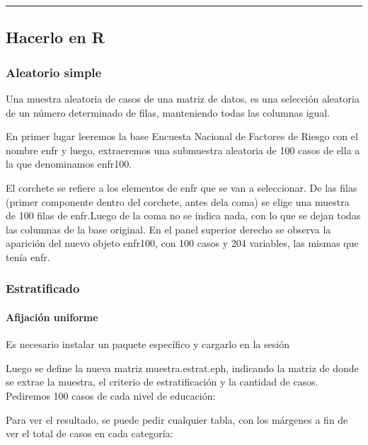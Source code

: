 \documentclass[]{article}
\let\oldparagraph\paragraph
\renewcommand{\paragraph}[1]{\oldparagraph{#1}\mbox{}}
\begin{document}
\begin{center}\rule{0.5\linewidth}{\linethickness}\end{center}

\hypertarget{hacerlo-en-r}{%
\subsection{Hacerlo en R}\label{hacerlo-en-r}}

\hypertarget{aleatorio-simple}{%
\subsubsection{Aleatorio simple}\label{aleatorio-simple}}

Una muestra aleatoria de casos de una matriz de datos, es una selección aleatoria de un número determinado de filas, manteniendo todas las columnas igual.

En primer lugar leeremos la base Encuesta Nacional de Factores de Riesgo con el nombre enfr y luego, extraeremos una submuestra aleatoria de 100 casos de ella a la que denominamos enfr100.

El corchete se refiere a los elementos de enfr que se van a seleccionar. De las filas (primer componente dentro del corchete, antes dela coma) se elige una muestra de 100 filas de enfr.Luego de la coma no se indica nada, con lo que se dejan todas las columnas de la base original. En el panel superior derecho se observa la aparición del nuevo objeto enfr100, con 100 casos y 204 variables, las mismas que tenía enfr.

\hypertarget{estratificado}{%
\subsubsection{Estratificado}\label{estratificado}}

\hypertarget{afijacion-uniforme}{%
\paragraph{Afijación uniforme}\label{afijacion-uniforme}}

Es necesario instalar un paquete específico y cargarlo en la sesión

Luego se define la nueva matriz muestra.estrat.eph, indicando la matriz de donde se extrae la muestra, el criterio de estratificación y la cantidad de casos. Pediremos 100 casos de cada nivel de educación:

Para ver el resultado, se puede pedir cualquier tabla, con los márgenes a fin de ver el total de casos en cada categoría:
\end{document}
